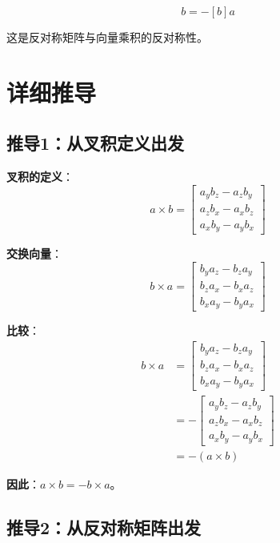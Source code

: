\documentclass[12pt,a4paper]{article}
\begin{document}
\begin{equation}
[a] b = -[b] a
\end{equation}

这是反对称矩阵与向量乘积的反对称性。

\section{详细推导}

\subsection{推导1：从叉积定义出发}

\textbf{叉积的定义}：
\begin{equation}
a \times b = \begin{bmatrix}
a_y b_z - a_z b_y \\
a_z b_x - a_x b_z \\
a_x b_y - a_y b_x
\end{bmatrix}
\end{equation}

\textbf{交换向量}：
\begin{equation}
b \times a = \begin{bmatrix}
b_y a_z - b_z a_y \\
b_z a_x - b_x a_z \\
b_x a_y - b_y a_x
\end{bmatrix}
\end{equation}

\textbf{比较}：
\begin{align}
b \times a &= \begin{bmatrix}
b_y a_z - b_z a_y \\
b_z a_x - b_x a_z \\
b_x a_y - b_y a_x
\end{bmatrix} \\
&= -\begin{bmatrix}
a_y b_z - a_z b_y \\
a_z b_x - a_x b_z \\
a_x b_y - a_y b_x
\end{bmatrix} \\
&= -(a \times b)
\end{align}

\textbf{因此}：$a \times b = -b \times a$。

\subsection{推导2：从反对称矩阵出发}
\end{document}
